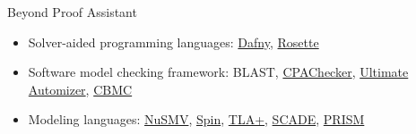 \documentclass[usenames,xcolor=svgnames,11pt,sans,aspectratio=169]{beamer}
\begin{document}
\begin{frame}{Beyond Proof Assistant}
  \begin{itemize}
    \item Solver-aided programming languages:
    \href{https://www.rise4fun.com/Dafny}{Dafny},
    \href{https://emina.github.io/rosette/}{Rosette}
    \item Software model checking framework: BLAST,
    \href{https://cpachecker.sosy-lab.org}{CPAChecker},
    \href{https://monteverdi.informatik.uni-freiburg.de/tomcat/Website/?ui=tool&tool=automizer}{Ultimate Automizer},
    \href{https://www.cprover.org/cbmc/}{CBMC}
    \item Modeling languages:
    \href{http://nusmv.fbk.eu}{NuSMV},
    \href{http://spinroot.com/spin/whatispin.html}{Spin},
    \href{https://lamport.azurewebsites.net/tla/tla.html}{TLA+},
    \href{https://www.ansys.com/products/embedded-software/ansys-scade-test}{SCADE},
    \href{https://www.prismmodelchecker.org}{PRISM}
  \end{itemize}
\end{frame}
\end{document}
